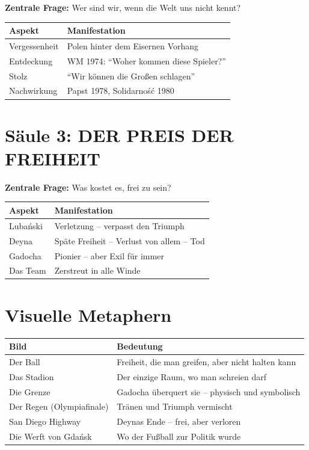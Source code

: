 \documentclass[11pt,a4paper]{book}
\begin{document}
\textbf{Zentrale Frage:} Wer sind wir, wenn die Welt uns nicht kennt?

\begin{longtable}{L{4cm}L{9cm}}
\toprule
\textbf{Aspekt} & \textbf{Manifestation} \\
\midrule
\endhead
Vergessenheit & Polen hinter dem Eisernen Vorhang \\
Entdeckung & WM 1974: ``Woher kommen diese Spieler?'' \\
Stolz & ``Wir können die Großen schlagen'' \\
Nachwirkung & Papst 1978, Solidarność 1980 \\
\bottomrule
\end{longtable}

\section{Säule 3: DER PREIS DER FREIHEIT}

\textbf{Zentrale Frage:} Was kostet es, frei zu sein?

\begin{longtable}{L{4cm}L{9cm}}
\toprule
\textbf{Aspekt} & \textbf{Manifestation} \\
\midrule
\endhead
Lubański & Verletzung -- verpasst den Triumph \\
Deyna & Späte Freiheit -- Verlust von allem -- Tod \\
Gadocha & Pionier -- aber Exil für immer \\
Das Team & Zerstreut in alle Winde \\
\bottomrule
\end{longtable}

\section{Visuelle Metaphern}

\begin{longtable}{L{4cm}L{9cm}}
\toprule
\textbf{Bild} & \textbf{Bedeutung} \\
\midrule
\endhead
Der Ball & Freiheit, die man greifen, aber nicht halten kann \\
Das Stadion & Der einzige Raum, wo man schreien darf \\
Die Grenze & Gadocha überquert sie -- physisch und symbolisch \\
Der Regen (Olympiafinale) & Tränen und Triumph vermischt \\
San Diego Highway & Deynas Ende -- frei, aber verloren \\
Die Werft von Gdańsk & Wo der Fußball zur Politik wurde \\
\bottomrule
\end{longtable}
\end{document}
